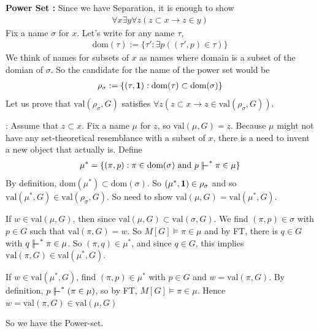 \documentclass[12pt,a4paper]{article}
\newenvironment{proof}
{\begin{changemargin}{0.5cm}{0.5cm} 
	}%
	{\end{changemargin}
}
\newenvironment{subproof}
{\begin{changemargin}{0.5cm}{0.5cm} 
	}%
	{\end{changemargin}
}
\newenvironment{p}
{\begin{proof} 
	}%
	{\end{proof}
}
\begin{document}
\begin{p}
\textbf{Power Set :} Since we have Separation, it is enough to show
\begin{align*}
\forall x \exists y \forall z (z\subset x \rightarrow z\in y)
\end{align*}
Fix a name $\sigma$ for $x$. Let's write for any name $\tau$,
\begin{align*}
\text{dom}(\tau) := \{\tau' : \exists p ((\tau', p) \in \tau) \}
\end{align*}
We think of names for subsets of $x$ as names where domain is a subset of the domian of $\sigma$. So the candidate for the name of the power set would be
\begin{align*}
\rho_{\sigma} := \{(\tau, \bm{1}) : \text{dom}(\tau) \subset \text{dom}(\sigma) \}
\end{align*}
Let us prove that $\text{val}(\rho_{\sigma}, G)$ satisfies $\forall z (z\subset x \rightarrow z\in \text{val}(\rho_{\sigma}, G))$.
\begin{subproof}
: Assume that $z\subset x$. Fix a name $\mu$ for $z$, so $\text{val}(\mu, G) =z$. Because $\mu$ might not have any set-theoretical resemblance with a subset of $x$, there is a need to invent a new object that actually is. Define 
\begin{align*}
\mu^* = \{ (\pi, p) : \pi \in \text{dom}(\sigma) \text{ and } p\forces^* \pi \in \mu \}
\end{align*}
By definition, $\text{dom}(\mu^*) \subset \text{dom}(\sigma)$. So $(\mu^*, \bm{1}) \in \rho_{\sigma}$ and so $\text{val}(\mu^*, G) \in \text{val}(\rho_{\sigma}, G)$. So need to show $\text{val}(\mu, G) = \text{val}(\mu^*, G)$.

\quad If $w\in \text{val}(\mu, G)$, then since $\text{val}(\mu, G) \subset \text{val}(\sigma, G)$. We find $(\pi, p) \in \sigma$ with $p\in G$ such that $\text{val}(\pi, G) =w$. So $M[G]\models \pi \in \mu$ and by FT, there is $q\in G$ with $q\forces^* \pi \in \mu$. So $(\pi, q) \in \mu^*$, and since $q\in G$, this implies $\text{val}(\pi, G) \in \text{val}(\mu^*, G)$.

\quad If $w\in \text{val}(\mu^*, G)$, find $(\pi, p) \in \mu^*$ with $p\in G$ and $w= \text{val}(\pi, G)$. By definition, $p\forces^* (\pi \in \mu)$, so by FT, $M[G] \models \pi\in \mu$. Hence $w=\text{val}(\pi, G) \in \text{val}(\mu, G)$
\end{subproof}
So we have the Power-set.

\eop
\end{p}
\s

\newday
\end{document}
